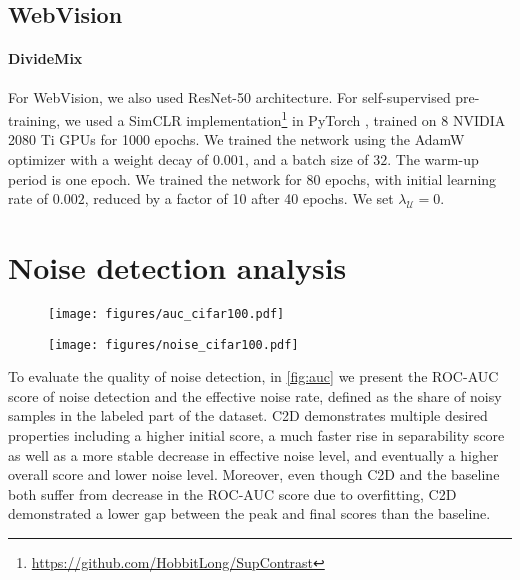 \documentclass[10pt,twocolumn,letterpaper]{article}
\renewcommand{\cite}[1]{\citep{#1}}
\begin{document}
\subsection{WebVision}

\paragraph{DivideMix}
For WebVision, we also used ResNet-50 architecture.
For self-supervised pre-training, we used a SimCLR implementation\footnote{\url{https://github.com/HobbitLong/SupContrast}} in PyTorch \cite{paszke2019pytorch}, trained on 8 NVIDIA 2080 Ti GPUs for 1000 epochs.
We trained the network using the AdamW optimizer \cite{loshchilov2017decoupled} with a weight decay of $0.001$, and a batch size of $32$. The warm-up period is one epoch. We trained the network for 80 epochs, with initial learning rate of $0.002$, reduced by a factor of 10 after 40 epochs.
We set $\lambda_{\mathcal{U}}=0$. 


\section{Noise detection analysis}


\begin{figure*}
\centering
    \begin{subfigure}{0.49\linewidth}
        \texttt{[image: figures/auc\_cifar100.pdf]}
    \end{subfigure}
    \begin{subfigure}{0.49\linewidth}
        \texttt{[image: figures/noise\_cifar100.pdf]}
    \end{subfigure}
 \caption{Training time ROC-AUC scores (left) and effective noise rates (right). C2D demonstrates higher initial score, faster rise, and more stable decrease in effective noise level.}
\label{fig:auc}
\end{figure*}


To evaluate the quality of noise detection, in \cref{fig:auc} we present the ROC-AUC score of noise detection and the effective noise rate, defined as the share of noisy samples in the labeled part of the dataset. C2D demonstrates multiple desired properties including a higher initial score, a much faster rise in separability score as well as a more stable decrease in effective noise level, and eventually a higher overall score and lower noise level. Moreover, even though C2D and the baseline both suffer from decrease in the ROC-AUC score due to overfitting, C2D demonstrated a lower gap between the peak and final scores than the baseline.

 
\end{document}
